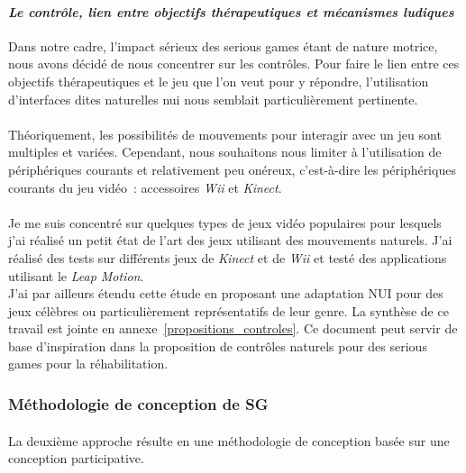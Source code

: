 			\paragraph{\emph{Le contrôle, lien entre objectifs thérapeutiques et mécanismes ludiques}\\}
Dans notre cadre, l'impact sérieux des serious games étant de nature motrice, nous avons décidé de nous concentrer sur les contrôles. Pour faire le lien entre ces objectifs thérapeutiques et le jeu que l’on veut pour y répondre, l’utilisation d’interfaces dites naturelles \gls{nui} nous semblait particulièrement pertinente. 

\paragraph{} 
Théoriquement, les possibilités de mouvements pour interagir avec un jeu sont multiples et variées. Cependant, nous souhaitons nous limiter à l'utilisation de périphériques courants et relativement peu onéreux, c'est-à-dire les périphériques courants du jeu vidéo~: accessoires \emph{Wii} et \emph{Kinect}.

\paragraph{} Je me suis concentré sur quelques types de jeux vidéo populaires pour lesquels j'ai réalisé un petit état de l'art des jeux utilisant des mouvements naturels. J'ai réalisé des tests sur différents jeux de \emph{Kinect} et de \emph{Wii} et testé des applications utilisant le \emph{Leap Motion}. \\J'ai par ailleurs étendu cette étude en proposant une adaptation NUI pour des jeux célèbres ou particulièrement représentatifs de leur genre.
La synthèse de ce travail est jointe en annexe~\ref{propositions_controles}. Ce document peut servir de base d'inspiration dans la proposition de contrôles naturels pour des serious games pour la réhabilitation.

	
	\subsubsection{Méthodologie de conception de SG}
	\paragraph{}
La deuxième approche résulte en une méthodologie de conception basée sur une conception participative. 

